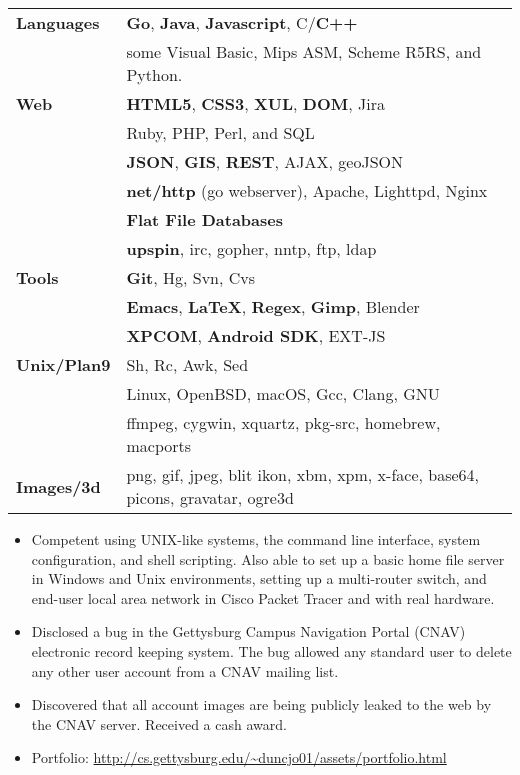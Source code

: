 \documentclass[11pt]{article}
\begin{document}
	\begin{tabular}{ l l }
  	\textbf{Languages} & \textbf{Go}, \textbf{Java}, \textbf{Javascript}, C/\textbf{C++} \\
  	& some Visual Basic, Mips ASM, Scheme R5RS, and Python. \\
  	
  	\textbf{Web} & \textbf{HTML5}, \textbf{CSS3}, \textbf{XUL}, \textbf{DOM}, Jira \\
  	& Ruby, PHP, Perl, and SQL \\
  	& \textbf{JSON}, \textbf{GIS}, \textbf{REST}, AJAX, geoJSON \\
  	& \textbf{net/http} (go webserver), Apache, Lighttpd, Nginx \\
  	& \textbf{Flat File Databases} \\
  	& \textbf{upspin}, irc, gopher, nntp, ftp, ldap \\
  	
  	\textbf{Tools} & \textbf{Git}, Hg, Svn, Cvs \\
  	& \textbf{Emacs}, \textbf{\LaTeX}, \textbf{Regex}, \textbf{Gimp}, Blender \\
  	& \textbf{XPCOM}, \textbf{Android SDK}, EXT-JS \\
  	
  	\textbf{Unix/Plan9} & Sh, Rc, Awk, Sed \\
  	&Linux, OpenBSD, macOS, Gcc, Clang, GNU \\
  	&ffmpeg, cygwin, xquartz, pkg-src, homebrew, macports \\
  	
  	\textbf{Images/3d} & png, gif, jpeg, blit ikon, xbm, xpm, x-face, base64, picons, gravatar, ogre3d \\
  	
	\end{tabular}
\begin{itemize}
	\item Competent using UNIX-like systems, the command line interface, system configuration, and shell scripting. Also able to set up a basic home file server in Windows and Unix environments, setting up a multi-router switch, and end-user local area network in Cisco Packet Tracer and with real hardware.
	\item Disclosed a bug in the Gettysburg Campus Navigation Portal (CNAV) electronic record keeping system. The bug allowed any standard user to delete any other user account from a CNAV mailing list.
	\item Discovered that all account images are being publicly leaked to the web by the CNAV server. Received a cash award.
	\item Portfolio: \url{http://cs.gettysburg.edu/~duncjo01/assets/portfolio.html}
\end{itemize}
\end{document}
